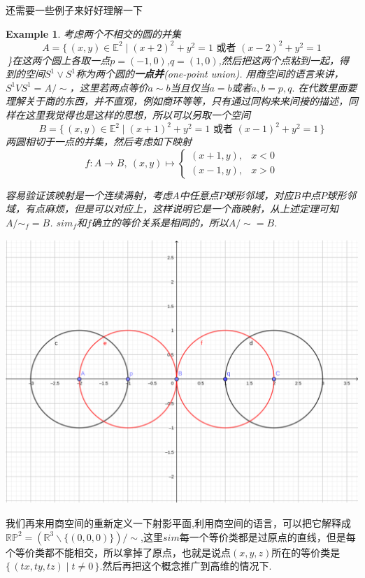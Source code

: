 \documentclass{article}
\newtheorem{example}[theorem]{Example}
\newcommand*{\xfunc}[4]{{#2}\colon{#3}{#1}{#4}}
\newcommand*{\func}[3]{\xfunc{\to}{#1}{#2}{#3}}
\newcommand\Set[2]{\{\,#1\mid#2\,\}} %
\begin{document}
还需要一些例子来好好理解一下
\begin{example}
考虑两个不相交的圆的并集\[A=\Set{(x,y) \in \mathbb{E}^2}{(x+2)^2+y^2=1 \text{ 或者 }(x-2)^2+y^2=1\]}在这两个圆上各取一点$p=(-1,0)$,$q=(1,0)$,然后把这两个点粘到一起，得到的空间$S^1 \vee S^1$称为两个圆的\textbf{一点并}(one-point union). 用商空间的语言来讲，$S^1 V S^1=A / \sim$，这里若两点等价$a \sim b$当且仅当$a=b$或者${a,b} = {p,q}.$ 在代数里面要理解关于商的东西，并不直观，例如商环等等，只有通过同构来来间接的描述，同样在这里我觉得也是这样的思想，所以可以另取一个空间\[B=\Set{(x,y) \in \mathbb{E}^2}{(x+1)^2+y^2=1 \text{ 或者 }(x-1)^2+y^2=1}\]两圆相切于一点的并集，然后考虑如下映射
$$
	\func{f}{A}{B},\ (x,y) \mapsto \left\{
    \begin{array}{cc}
           (x+1,y) ,& x<0 \\
           (x-1,y) ,& x>0
    \end{array}
	\right.
$$

容易验证该映射是一个连续满射，考虑$A$中任意点$P$球形邻域，对应$B$中点$P$球形邻域，有点麻烦，但是可以对应上，这样说明它是一个商映射，从上述定理可知$A / \sim_f = B$. $sim_f$和$f$确立的等价关系是相同的，所以$A / \sim = B$.

\begin{center}
\includegraphics[width=15cm, height=10cm]{images/one-point-union.png}
\end{center}
\end{example}

我们再来用商空间的重新定义一下射影平面,利用商空间的语言，可以把它解释成$\mathbb{R}\mathbb{P}^2=(\mathbb{R}^3 \smallsetminus \{(0,0,0)\}) / \sim$,这里$sim$每一个等价类都是过原点的直线，但是每个等价类都不能相交，所以拿掉了原点，也就是说点$(x,y,z)$所在的等价类是$\Set{(tx,ty,tz)}{ t \neq 0}$.然后再把这个概念推广到高维的情况下.
\end{document}
